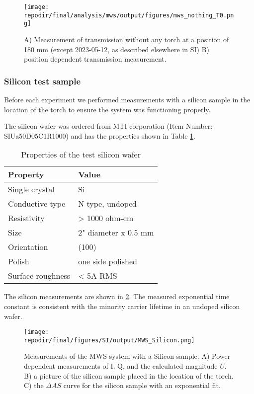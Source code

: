 \begin{figure}[]
\centering
\texttt{[image: \\repodir/final/analysis/mws/output/figures/mws\_nothing\_T0.png]}
\caption{A) Measurement of transmission without any torch at a position of 180 mm (except 2023-05-12, as described elsewhere in SI) B) position dependent transmission measurement.}
\label{fig:SI_MWS_nothing_T0}
\end{figure}

\subsubsection{Silicon test sample}

Before each experiment we performed measurements with a silicon sample in the location of the torch to ensure the system was functioning properly. 

The silicon wafer was ordered from MTI corporation (Item Number: SIUa50D05C1R1000) and has the properties shown in Table \ref{table:material_properties}.

\begin{table}[h]
\centering
\begin{tabular}{|l|l|}
\hline
Property & Value \\
\hline
Single crystal & Si \\
Conductive type & N type, undoped \\
Resistivity & > 1000 ohm-cm \\
Size & 2" diameter x 0.5 mm \\
Orientation & (100) \\
Polish & one side polished \\
Surface roughness & < 5A RMS \\
\hline
\end{tabular}
\caption{Properties of the test silicon wafer}
\label{table:material_properties}
\end{table}

The silicon measurements are shown in \ref{fig:SI_MWS_Silicon}. The measured exponential time constant is consistent with the minority carrier lifetime in an undoped silicon wafer. \cite{tyagiMINORITYCARRIERRECOMBINATION, delalamoModellingMinoritycarrierTransport1987} 

\begin{figure}[]
\centering
\texttt{[image: \\repodir/final/figures/SI/output/MWS\_Silicon.png]}
\caption{Measurements of the MWS system with a Silicon sample. A) Power dependent measurements of I, Q, and the calculated magnitude $U$. B) a picture of the silicon sample placed in the location of the torch. C) the $\Delta AS$ curve for the silicon sample with an exponential fit. }
\label{fig:SI_MWS_Silicon}
\end{figure}








